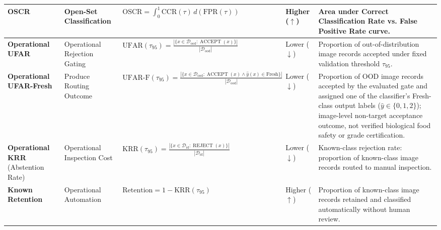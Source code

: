 \begin{table}[!t]
\begin{tabular}{>{\raggedright\arraybackslash}p{2.2cm} >{\centering\arraybackslash}p{2.0cm} >{\raggedright\arraybackslash}p{4.4cm} >{\centering\arraybackslash}p{1.4cm} >{\raggedright\arraybackslash}p{4.3cm}}
\addlinespace[3pt]
\textbf{OSCR} & Open-Set Classification & $\text{OSCR} = \int_{0}^1 \text{CCR}(\tau) \, d(\text{FPR}(\tau))$ & Higher ($\uparrow$) & Area under Correct Classification Rate vs. False Positive Rate curve. \\
\midrule
\textbf{Operational UFAR} & Operational Rejection Gating & $\text{UFAR}(\tau_{95}) = \frac{|\{x \in \mathcal{D}_{\text{ood}} : \operatorname{ACCEPT}(x)\}|}{|\mathcal{D}_{\text{ood}}|}$ & Lower ($\downarrow$) & Proportion of out-of-distribution image records accepted under fixed validation threshold $\tau_{95}$. \\
\addlinespace[3pt]
\textbf{Operational UFAR-Fresh} & Produce Routing Outcome & $\text{UFAR-F}(\tau_{95}) = \frac{|\{x \in \mathcal{D}_{\text{ood}} : \operatorname{ACCEPT}(x) \land \hat{y}(x) \in \text{Fresh}\}|}{|\mathcal{D}_{\text{ood}}|}$ & Lower ($\downarrow$) & Proportion of OOD image records accepted by the evaluated gate and assigned one of the classifier's Fresh-class output labels ($\hat{y} \in \{0,1,2\}$); image-level non-target acceptance outcome, not verified biological food safety or grade certification. \\
\addlinespace[3pt]
\textbf{Operational KRR} \newline (Abstention Rate) & Operational Inspection Cost & $\text{KRR}(\tau_{95}) = \frac{|\{x \in \mathcal{D}_{\text{id}} : \operatorname{REJECT}(x)\}|}{|\mathcal{D}_{\text{id}}|}$ & Lower ($\downarrow$) & Known-class rejection rate: proportion of known-class image records routed to manual inspection. \\
\addlinespace[3pt]
\textbf{Known Retention} & Operational Automation & $\text{Retention} = 1 - \text{KRR}(\tau_{95})$ & Higher ($\uparrow$) & Proportion of known-class image records retained and classified automatically without human review. \\
\bottomrule
\end{tabular}
\end{table}

